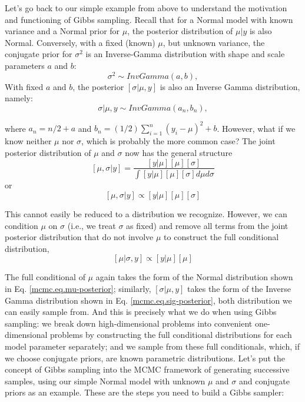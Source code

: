 Let's go back to our simple example from above to understand the
motivation and functioning of Gibbs sampling. Recall that for a Normal
model with known variance and a Normal prior for $\mu$, the posterior
distribution of $\mu|y$ is also Normal. Conversely, with a fixed
(known) $\mu$, but unknown variance, the conjugate prior for
$\sigma^2$ is an Inverse-Gamma distribution with shape and scale
parameters $a$ and $b$:
\[
\sigma^2 \sim InvGamma(a,b),
\]
With fixed $a$ and $b$, the posterior $[\sigma|\mu,y]$ is also an Inverse Gamma distribution, namely:
\begin{equation}
\sigma|\mu,y \sim InvGamma (a_n, b_n),
\label{mcmc.eq.sig-posterior}
\end{equation}

 where  $a_n = n/2   + a$ and $b_n = (1/2) \displaystyle\sum\limits_{i=1}^{n} (y_i-\mu)^2 + b$.
However, what if we know neither $\mu$ nor $\sigma$, which is probably the
more common case? The joint posterior distribution of $\mu$ and $\sigma$
now has the general structure
\[
[\mu, \sigma|y] = \frac{[y|\mu] [\mu] [\sigma]}{ \int [y|\mu] [\mu] [\sigma] d\mu d\sigma }
\]
or
\[
[\mu, \sigma|y] \propto [y|\mu] [\mu] [\sigma]
\]

This cannot easily be reduced to a distribution we recognize. However,
we can condition $\mu$ on $\sigma$ (i.e., we treat $\sigma$ as fixed) and remove
all terms from the joint posterior distribution that do not involve $\mu$
to construct the full conditional distribution,
\[
[\mu|\sigma,y]  \propto [y|\mu] [\mu]
\]

The full conditional of $\mu$ again takes the form of the Normal
distribution shown in Eq. \ref{mcmc.eq.mu-posterior}; similarly, $[\sigma|\mu,y]$ takes
the form of the Inverse Gamma distribution shown in
Eq. \ref{mcmc.eq.sig-posterior}, both distribution we can easily sample
from. And this is precisely what we do when using Gibbs sampling: we
break down high-dimensional problems into convenient one-dimensional
problems by constructing the full conditional distributions for each
model parameter separately; and we sample from these full
conditionals, which, if we choose conjugate priors, are known
parametric distributions.
Let's put the concept of Gibbs sampling into the MCMC framework of
generating successive samples, using our simple Normal model with
unknown $\mu$ and $\sigma$ and conjugate priors as an example. These are the
steps you need to build a Gibbs sampler:

